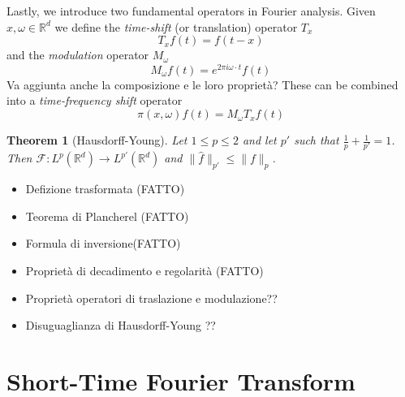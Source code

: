 \documentclass[corpo=11pt, stile=classica, tipotesi=custom,
greek, evenboxes, english]{toptesi}
\numberwithin{equation}{chapter}
\newtheorem{teo}{Theorem}[chapter] %
\newcommand{\R}{\mathbb{R}} %
\newcommand{\F}{\mathcal{F}} %
\begin{document}
Lastly, we introduce two fundamental operators in Fourier analysis. Given $x,\omega \in \R^d$ we define the \emph{time-shift} (or translation) operator $T_x$
\begin{equation}\label{time-shift operator def}
	T_x f(t) = f(t-x)
\end{equation}
and the \emph{modulation} operator $M_{\omega}$
\begin{equation}\label{modulation operator def}
	M_{\omega} f(t) = e^{2 \pi i \omega \cdot t} f(t)
\end{equation}
{\color{blue} Va aggiunta anche la composizione e le loro proprietà?}
These can be combined into a \emph{time-frequency shift} operator
\begin{equation}\label{time-frequency shift def}
	\pi(x,\omega) f(t) = M_{\omega} T_x f(t)
\end{equation}
{\color{blue}\begin{teo}[Hausdorff-Young]
	Let $1 \leq p \leq 2$ and let $p'$ such that $\frac{1}{p} + \frac{1}{p'} = 1$. Then $\F : L^p(\R^d) \rightarrow L^{p'}(\R^d)$ and $\| \hat{f }\|_{p'} \leq \| f \|_p$.
\end{teo}}

	\begin{itemize}
		\item Defizione trasformata (FATTO)
		\item Teorema di Plancherel (FATTO)
		\item Formula di inversione(FATTO)
		\item Proprietà di decadimento e regolarità (FATTO)
		\item Proprietà operatori di traslazione e modulazione??
		\item Disuguaglianza di Hausdorff-Young ??
	\end{itemize}


\chapter{Short-Time Fourier Transform}\label{chapter STFT}
\end{document}
